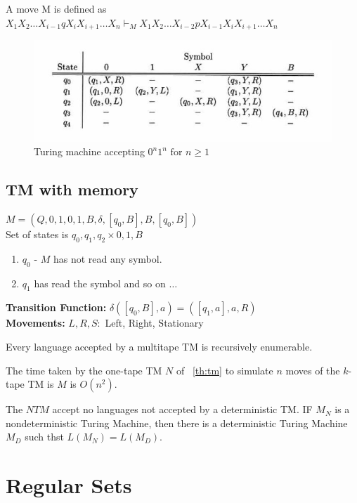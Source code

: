 \documentclass[a4paper,oneside]{book}
\begin{document}
A move M is defined as $X_1X_2\ldots X_{i- 1}qX_iX_{ i+1}\ldots X_n \vdash_M X_1X_2\ldots X_{i-2}pX_{i- 1}X_iX_{ i+1}\ldots X_n$
\begin{figure}[H]
\includegraphics[width=\textwidth,height=\textheight/3]{Images/turingmachine.jpeg}
\caption{Turing machine accepting $0^n1^n \text{ for } n \ge 1$}
\label{fig:turing_machine}
\end{figure}
\section{TM with memory}
$M = (Q, {0, 1}, {0, 1, B}, \delta, [q_0, B], B, [q_0, B])$\\
Set of states is ${q_0, q_1, q_2} \times {0, 1, B}$\\
\begin{enumerate}
	\item $q_0$ - $M$ has not read any symbol.
	\item $q_1$ has read the symbol and so on $\ldots$
\end{enumerate}
\textbf{Transition Function:} $\delta([q_0, B], a) = ([q_1, a], a, R)$\\
\textbf{Movements:} $L, R, S:$ Left, Right, Stationary
\begin{theorem}
	Every language accepted by a multitape TM is recursively enumerable.
	\label{th:tm}
\end{theorem}
\begin{theorem}
	The time taken by the one-tape TM $N$ of ~\ref{th:tm} to simulate $n$ moves of the $k$-tape TM is $M$ is $O(n^2)$.
\end{theorem}
\begin{theorem}
	The $NTM$ accept no languages not accepted by a deterministic TM. IF $M_N$ is a nondeterministic Turing Machine, then there is a deterministic Turing Machine $M_D$ such thst $L(M_N) = L(M_D)$.
\end{theorem}
\unboldmath
\chapter{Regular Sets}
\end{document}
